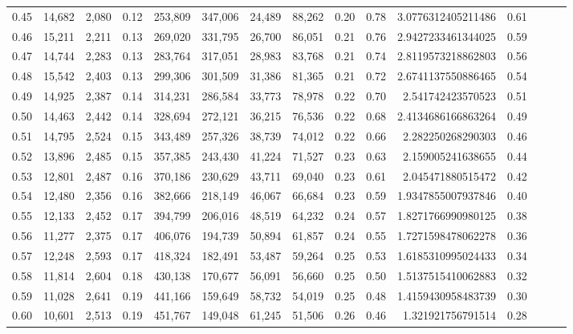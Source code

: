 \begin{tabular}{rrrrrrrrrrrrrrr}
0.45 &  14,682 &  2,080 &  0.12 &  253,809 &  347,006 &   24,489 &   88,262 &  0.20 &  0.78 &      3.0776312405211486 &      0.61 \\
0.46 &  15,211 &  2,211 &  0.13 &  269,020 &  331,795 &   26,700 &   86,051 &  0.21 &  0.76 &      2.9427233461344025 &      0.59 \\
0.47 &  14,744 &  2,283 &  0.13 &  283,764 &  317,051 &   28,983 &   83,768 &  0.21 &  0.74 &      2.8119573218862803 &      0.56 \\
0.48 &  15,542 &  2,403 &  0.13 &  299,306 &  301,509 &   31,386 &   81,365 &  0.21 &  0.72 &      2.6741137550886465 &      0.54 \\
0.49 &  14,925 &  2,387 &  0.14 &  314,231 &  286,584 &   33,773 &   78,978 &  0.22 &  0.70 &       2.541742423570523 &      0.51 \\
0.50 &  14,463 &  2,442 &  0.14 &  328,694 &  272,121 &   36,215 &   76,536 &  0.22 &  0.68 &      2.4134686166863264 &      0.49 \\
0.51 &  14,795 &  2,524 &  0.15 &  343,489 &  257,326 &   38,739 &   74,012 &  0.22 &  0.66 &       2.282250268290303 &      0.46 \\
0.52 &  13,896 &  2,485 &  0.15 &  357,385 &  243,430 &   41,224 &   71,527 &  0.23 &  0.63 &       2.159005241638655 &      0.44 \\
0.53 &  12,801 &  2,487 &  0.16 &  370,186 &  230,629 &   43,711 &   69,040 &  0.23 &  0.61 &       2.045471880515472 &      0.42 \\
0.54 &  12,480 &  2,356 &  0.16 &  382,666 &  218,149 &   46,067 &   66,684 &  0.23 &  0.59 &      1.9347855007937846 &      0.40 \\
0.55 &  12,133 &  2,452 &  0.17 &  394,799 &  206,016 &   48,519 &   64,232 &  0.24 &  0.57 &      1.8271766990980125 &      0.38 \\
0.56 &  11,277 &  2,375 &  0.17 &  406,076 &  194,739 &   50,894 &   61,857 &  0.24 &  0.55 &      1.7271598478062278 &      0.36 \\
0.57 &  12,248 &  2,593 &  0.17 &  418,324 &  182,491 &   53,487 &   59,264 &  0.25 &  0.53 &      1.6185310995024433 &      0.34 \\
0.58 &  11,814 &  2,604 &  0.18 &  430,138 &  170,677 &   56,091 &   56,660 &  0.25 &  0.50 &      1.5137515410062883 &      0.32 \\
0.59 &  11,028 &  2,641 &  0.19 &  441,166 &  159,649 &   58,732 &   54,019 &  0.25 &  0.48 &      1.4159430958483739 &      0.30 \\
0.60 &  10,601 &  2,513 &  0.19 &  451,767 &  149,048 &   61,245 &   51,506 &  0.26 &  0.46 &       1.321921756791514 &      0.28 \\

\end{tabular}
